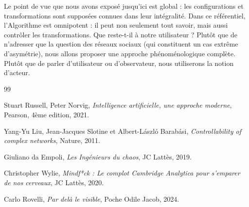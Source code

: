 \documentclass{report}
\begin{document}
	Le point de vue que nous avons exposé jusqu'ici est global : les configurations et transformations sont supposées connues dans leur intégralité. Dans ce référentiel, l'Algorithme est omnipotent : il peut non seulement tout savoir, mais aussi contrôler les transformations. Que reste-t-il à notre utilisateur ? Plutôt que de n'adresser que la question des réseaux sociaux (qui constituent un cas extrême d'asymétrie), nous allons proposer une approche phénoménologique complète. Plutôt que de parler d'utilisateur ou d'observateur, nous utiliserons la notion d'acteur. 
	


	


\begin{thebibliography}{99}
	
	Stuart Russell, Peter Norvig, 
	\textit{Intelligence artificielle, une approche moderne},
	Pearson,
	4ème edition,
	2021.
	
	Yang-Yu Liu, Jean-Jacques Slotine et Albert-László Barabási, 
	\textit{Controllability of complex networks},
	Nature, 
	2011.
	
	Giuliano da Empoli,
	\textit{Les Ingénieurs du chaos},
	JC Lattès,
	2019.
	
	Christopher Wylie,
	\textit{Mindf*ck : Le complot Cambridge Analytica pour s'emparer de nos cerveaux},
	JC Lattès,
	2020.
	
	Carlo Rovelli, 
	\textit{Par delà le visible},
	Poche Odile Jacob, 
	2024.
	
\end{thebibliography}
\end{document}
